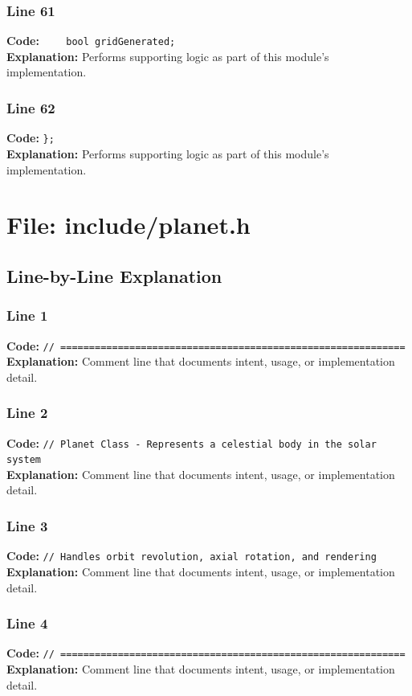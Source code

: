 \documentclass[11pt,a4paper]{article}
\begin{document}
\subsubsection*{Line 61}
\textbf{Code:} \verb|    bool gridGenerated;|\\
\textbf{Explanation:} Performs supporting logic as part of this module's implementation.

\subsubsection*{Line 62}
\textbf{Code:} \verb|};|\\
\textbf{Explanation:} Performs supporting logic as part of this module's implementation.

\newpage
\section{File: include/planet.h}
\subsection{Line-by-Line Explanation}
\subsubsection*{Line 1}
\textbf{Code:} \verb|// ============================================================|\\
\textbf{Explanation:} Comment line that documents intent, usage, or implementation detail.

\subsubsection*{Line 2}
\textbf{Code:} \verb|// Planet Class - Represents a celestial body in the solar system|\\
\textbf{Explanation:} Comment line that documents intent, usage, or implementation detail.

\subsubsection*{Line 3}
\textbf{Code:} \verb|// Handles orbit revolution, axial rotation, and rendering|\\
\textbf{Explanation:} Comment line that documents intent, usage, or implementation detail.

\subsubsection*{Line 4}
\textbf{Code:} \verb|// ============================================================|\\
\textbf{Explanation:} Comment line that documents intent, usage, or implementation detail.
\end{document}
